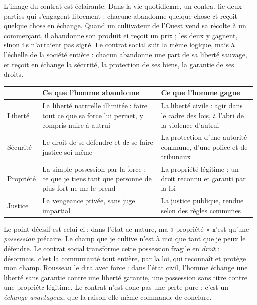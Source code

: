 \documentclass[11pt]{article}
\begin{document}
L'image du contrat est éclairante. Dans la vie quotidienne, un contrat lie deux parties qui s'engagent librement : chacune abandonne quelque chose et reçoit quelque chose en échange. Quand un cultivateur de l'Ouest vend sa récolte à un commerçant, il abandonne son produit et reçoit un prix ; les deux y gagnent, sinon ils n'auraient pas signé. Le contrat social suit la même logique, mais à l'échelle de la société entière : chacun abandonne une part de sa liberté sauvage, et reçoit en échange la sécurité, la protection de ses biens, la garantie de ses droits.

\begin{center}
\begin{tabularx}{\linewidth}{|l|X|X|}
\hline
\rowcolor{popblueL} & \textbf{Ce que l'homme abandonne} & \textbf{Ce que l'homme gagne} \\
\hline
Liberté & La liberté naturelle illimitée : faire tout ce que sa force lui permet, y compris nuire à autrui & La liberté civile : agir dans le cadre des lois, à l'abri de la violence d'autrui \\
\hline
Sécurité & Le droit de se défendre et de se faire justice soi-même & La protection d'une autorité commune, d'une police et de tribunaux \\
\hline
Propriété & La simple possession par la force : ce que je tiens tant que personne de plus fort ne me le prend & La propriété légitime : un droit reconnu et garanti par la loi \\
\hline
Justice & La vengeance privée, sans juge impartial & La justice publique, rendue selon des règles communes \\
\hline
\end{tabularx}
\end{center}

Le point décisif est celui-ci : dans l'état de nature, ma « propriété » n'est qu'une \emph{possession} précaire. Le champ que je cultive n'est à moi que tant que je peux le défendre. Le contrat social transforme cette possession fragile en \emph{droit} : désormais, c'est la communauté tout entière, par la loi, qui reconnaît et protège mon champ. Rousseau le dira avec force : dans l'état civil, l'homme échange une liberté sans garantie contre une liberté garantie, une possession sans titre contre une propriété légitime. Le contrat n'est donc pas une perte pure : c'est un \emph{échange avantageux}, que la raison elle-même commande de conclure.
\end{document}
